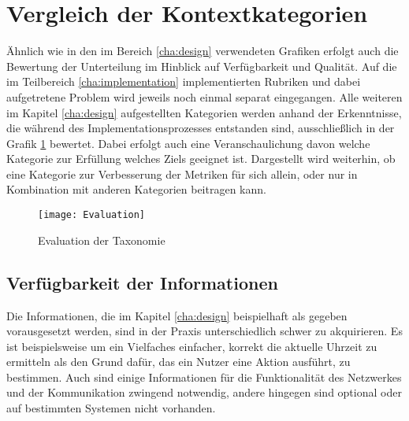 \section{Vergleich der Kontextkategorien} 
Ähnlich wie in den im Bereich \ref{cha:design} verwendeten Grafiken erfolgt auch die Bewertung der Unterteilung im Hinblick auf Verfügbarkeit und Qualität. Auf die im Teilbereich \ref{cha:implementation} implementierten Rubriken und dabei aufgetretene Problem wird jeweils noch einmal separat eingegangen. Alle weiteren im Kapitel \ref{cha:design} aufgestellten Kategorien werden anhand der Erkenntnisse, die während des Implementationsprozesses entstanden sind, ausschließlich in der Grafik \ref{Tax_Ev_1} bewertet. Dabei erfolgt auch eine Veranschaulichung davon welche Kategorie zur Erfüllung welches Ziels geeignet ist. Dargestellt wird weiterhin, ob eine Kategorie zur Verbesserung der Metriken für sich allein, oder nur in Kombination mit anderen Kategorien beitragen kann.
\begin{figure}[H]
\texttt{[image: Evaluation]}
\caption{Evaluation der Taxonomie}
\label{Tax_Ev_1}
\end{figure}

\subsection{Verfügbarkeit der Informationen}
Die Informationen, die im Kapitel \ref{cha:design} beispielhaft als gegeben vorausgesetzt werden, sind in der Praxis unterschiedlich schwer zu akquirieren. Es ist beispielsweise um ein Vielfaches einfacher, korrekt die aktuelle Uhrzeit zu ermitteln als den Grund dafür, das ein Nutzer eine Aktion ausführt, zu bestimmen. Auch sind einige Informationen für die Funktionalität des Netzwerkes und der Kommunikation zwingend notwendig, andere hingegen sind optional oder auf bestimmten Systemen nicht vorhanden.

